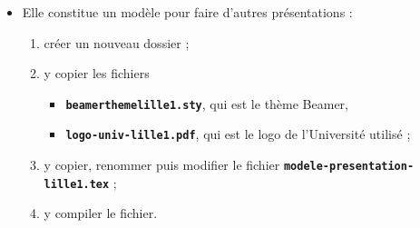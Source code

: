   \begin{itemize}
  \item Elle constitue un modèle pour faire d'autres présentations :
    
    \begin{enumerate}
    \item créer un nouveau dossier ;
    \item y copier les fichiers 

      \begin{itemize}
      \item \texttt{\textbf{beamerthemelille1.sty}}, qui est le thème Beamer,
      \item \texttt{\textbf{logo-univ-lille1.pdf}}, qui est le logo de l'Université utilisé ;
      \end{itemize}

    \item y copier, renommer puis modifier le fichier \texttt{\textbf{modele-presentation-lille1.tex}} ;
    \item y compiler le fichier.
    \end{enumerate}
  \end{itemize}
